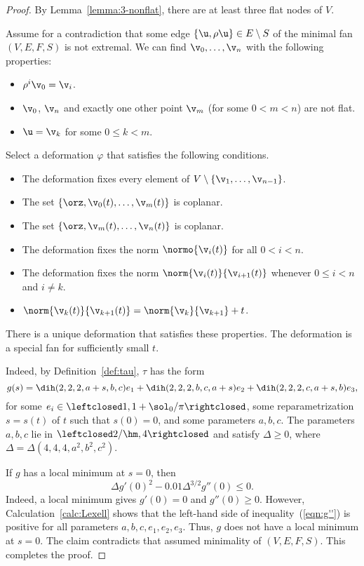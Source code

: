 \begin{proof} 
By Lemma~\ref{lemma:3-nonflat}, there are at least three flat
nodes of $V$.

Assume for a contradiction that some edge $\{\u,\rho\u\}\in
E\setminus S$ of the minimal fan $(V,E,F,S)$ is not extremal.  
We can find $\v_0,\ldots,\v_n$ with the following properties:
\begin{itemize}
\item $\rho^i\v_0 =\v_i$.
\item $\v_0$, $\v_n$ and exactly one other point $\v_m$ (for some
  $0<m<n$) are not flat.
\item $\u=\v_k$ for some $0\le k<m$.
\end{itemize}

Select a deformation $\varphi$ that satisfies the following conditions.
\begin{itemize}
\item The deformation fixes every element of
$V\setminus\{\v_1,\ldots,\v_{n-1}\}$.
\item The set $\{\orz,\v_0(t),\ldots,\v_m(t)\}$ is coplanar.
\item The set $\{\orz,\v_m(t),\ldots,\v_n(t)\}$ is coplanar.
\item The deformation  fixes the norm $\normo{\v_i(t)}$ for all $0<i<n$.
\item The deformation fixes the norm $\norm{\v_i(t)}{\v_{i+1}(t)}$
  whenever $0\le i<n$ and $i\ne k$.
\item $\norm{\v_k(t)}{\v_{k+1}(t)} = \norm{\v_k}{\v_{k+1}}+t$.
\end{itemize}
There is a unique deformation that satisfies these properties.  The
deformation is a special fan for sufficiently small $t$.

  Indeed, by Definition~\ref{def:tau},
$\tau$ has the form
\begin{displaymath}
  g(s) = \dih(2,2,2,a+s,b,c) e_1 
+ \dih(2,2,2,b,c,a+s) e_2 + \dih(2,2,2,c,a+s,b) e_3,
\end{displaymath}
for some $e_i\in\leftclosed1,1+\sol_0/\pi\rightclosed$, some
reparametrization $s=s(t)$ of $t$ such that $s(0)=0$, and some
parameters $a,b,c$.  The parameters $a,b,c$ lie in
$\leftclosed2/\hm,4\rightclosed$ and satisfy $\Delta\ge0$, where
$\Delta = \Delta(4,4,4,a^2,b^2,c^2)$.

If $g$ has a local minimum at $s=0$, then
\begin{equation}\label{eqn:g''}
\Delta g'(0)^2 - 0.01\Delta^{3/2} g''(0) \le 0.
\end{equation}
Indeed, a local minimum gives $g'(0)=0$ and $g''(0)\ge0$.  However,
Calculation~\ref{calc:Lexell} shows that the left-hand side of
inequality~(\ref{eqn:g''}) is positive for all parameters
$a,b,c,e_1,e_2,e_3$.  Thus, $g$ does not have a local minimum at
$s=0$.  The claim contradicts that assumed minimality of $(V,E,F,S)$.
This completes the proof.
\end{proof}


